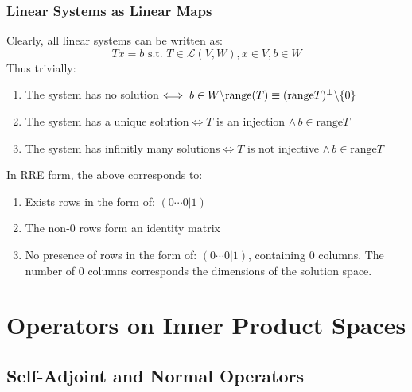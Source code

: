 \documentclass{article}
\newcommand{\st}{\mbox{ s.t. }}
\newcommand{\0}{{\bf{0}}}
\begin{document}
\subsubsection{Linear Systems as Linear Maps}
Clearly, all linear systems can be written as: 
$$Tx=b\st T\in\mathcal{L}(V,W),x\in V,b\in W$$
Thus trivially:
\begin{enumerate}
    \item The system has no solution$\iff b\in W\symbol{92}\mbox{range}(T)\equiv(\mbox{range}T)^\perp\symbol{92}\{0\}$
    \item The system has a unique solution$\iff T$ is an injection $\land\,b\in\mbox{range}T$
    \item The system has infinitly many solutions$\iff T$ is not injective $\land\,b\in\mbox{range}T$
\end{enumerate}
In RRE form, the above corresponds to:
\begin{enumerate}
    \item Exists rows in the form of: $(0\cdots0|1)$
    \item The non-0 rows form an identity matrix
    \item No presence of rows in the form of: $(0\cdots0|1)$, containing 0 columns. The number of 0 columns corresponds the dimensions of the solution space.
\end{enumerate}
\clearpage
\section{Operators on Inner Product Spaces}
\subsection{Self-Adjoint and Normal Operators}
\end{document}

